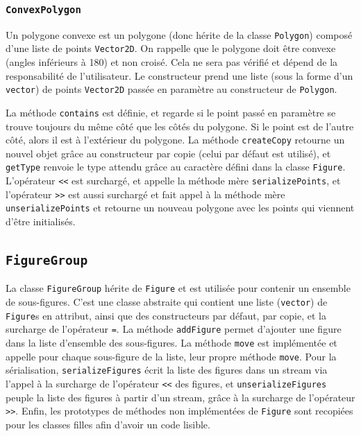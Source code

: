 \documentclass[11pt,a4paper]{article}
\begin{document}
	\subsubsection{\texttt{ConvexPolygon}}
	Un polygone convexe est un polygone (donc hérite de la classe \texttt{Polygon}) composé d'une liste de points \texttt{Vector2D}. On rappelle que le polygone doit être convexe (angles inférieurs à 180\degree) et non croisé. Cela ne sera pas vérifié et dépend de la responsabilité de l'utilisateur. Le constructeur prend une liste (sous la forme d'un \texttt{vector}) de points \texttt{Vector2D} passée en paramètre au constructeur de \texttt{Polygon}.
	
	La méthode \texttt{contains} est définie, et regarde si le point passé en paramètre se trouve toujours du même côté que les côtés du polygone. Si le point est de l'autre côté, alors il est à l'extérieur du polygone. La méthode \texttt{createCopy} retourne un nouvel objet grâce au constructeur par copie (celui par défaut est utilisé), et \texttt{getType} renvoie le type attendu grâce au caractère défini dans la classe \texttt{Figure}. L'opérateur \texttt{<<} est surchargé, et appelle la méthode mère \texttt{serializePoints}, et l'opérateur \texttt{>>} est aussi surchargé et fait appel à la méthode mère \texttt{unserializePoints} et retourne un nouveau polygone avec les points qui viennent d'être initialisés.
	
	\subsection{\texttt{FigureGroup}}
	La classe \texttt{FigureGroup} hérite de \texttt{Figure} et est utilisée pour contenir un ensemble de sous-figures. C'est une classe abstraite qui contient une liste (\texttt{vector}) de \texttt{Figure}s en attribut, ainsi que des constructeurs par défaut, par copie, et la surcharge de l'opérateur \texttt{=}. La méthode \texttt{addFigure} permet d'ajouter une figure dans la liste d'ensemble des sous-figures. La méthode \texttt{move} est implémentée et appelle pour chaque sous-figure de la liste, leur propre méthode \texttt{move}. Pour la sérialisation, \texttt{serializeFigures} écrit la liste des figures dans un stream via l'appel à la surcharge de l'opérateur \texttt{<<} des figures, et \texttt{unserializeFigures} peuple la liste des figures à partir d'un stream, grâce à la surcharge de l'opérateur \texttt{>>}. Enfin, les prototypes de méthodes non implémentées de \texttt{Figure} sont recopiées pour les classes filles afin d'avoir un code lisible.
	
\end{document}
